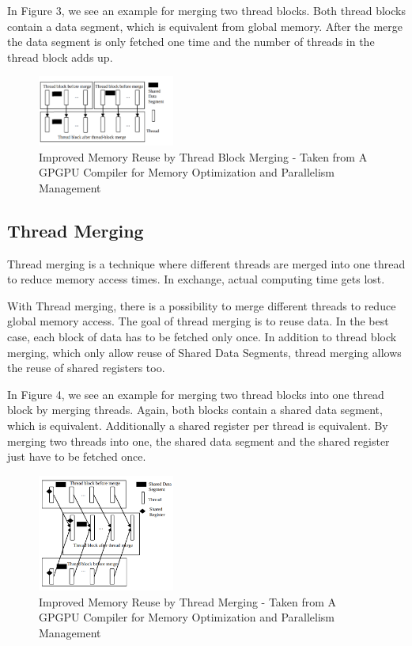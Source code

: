 \documentclass[conference]{IEEEtran}
\begin{document}
	
	In Figure 3, we see an example for merging two thread blocks. Both thread blocks contain a data segment, which is equivalent from global memory. After the merge the data segment is only fetched one time and the number of threads in the thread block adds up.
	
	\begin{figure}[htbp]
		\centerline{\includegraphics[width=0.4\textwidth]{ThreadBlockMerge.png}}
		\caption{Improved Memory Reuse by Thread Block Merging - Taken from A GPGPU Compiler for Memory Optimization and Parallelism Management}
		\label{fig3}
	\end{figure}
	
	\subsection{Thread Merging}
	
	
	Thread merging is a technique where different threads are merged into one thread to reduce memory access times. In exchange, actual computing time gets lost.
	
		
	With Thread merging, there is a possibility to merge different threads to reduce global memory access. 
	The goal of thread merging is to reuse data. In the best case, each block of data has to be fetched only once. In addition to thread block merging, which only allow reuse of Shared Data Segments, thread merging allows the reuse of shared registers too. 
	
	
	In Figure 4, we see an example for merging two thread blocks into one thread block by merging threads. Again, both blocks contain a shared data segment, which is equivalent. Additionally a shared register per thread is equivalent. By merging two threads into one, the shared data segment and the shared register just have to be fetched once.
	
	\begin{figure}[htbp]
		\centerline{\includegraphics[width=0.4\textwidth]{ThreadMerge.png}}
		\caption{Improved Memory Reuse by Thread Merging - Taken from  A GPGPU Compiler for Memory Optimization and Parallelism Management}
		\label{fig2}
	\end{figure}
	
\end{document}
